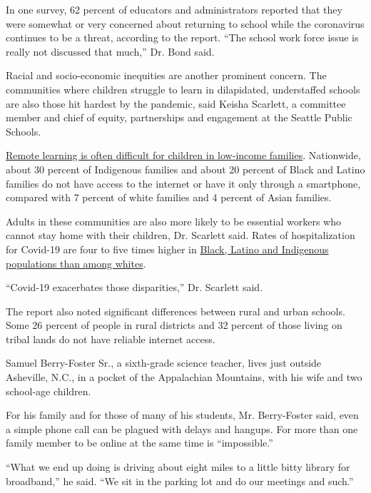 In one survey, 62 percent of educators and administrators reported that
they were somewhat or very concerned about returning to school while the
coronavirus continues to be a threat, according to the report. ``The
school work force issue is really not discussed that much,'' Dr. Bond
said.

Racial and socio-economic inequities are another prominent concern. The
communities where children struggle to learn in dilapidated,
understaffed schools are also those hit hardest by the pandemic, said
Keisha Scarlett, a committee member and chief of equity, partnerships
and engagement at the Seattle Public Schools.

\href{https://www.nytimes.com/2020/04/06/us/coronavirus-schools-attendance-absent.html}{Remote
learning is often difficult for children in low-income families}.
Nationwide, about 30 percent of Indigenous families and about 20 percent
of Black and Latino families do not have access to the internet or have
it only through a smartphone, compared with 7 percent of white families
and 4 percent of Asian families.

Adults in these communities are also more likely to be essential workers
who cannot stay home with their children, Dr. Scarlett said. Rates of
hospitalization for Covid-19 are four to five times higher in
\href{https://www.nytimes.com/interactive/2020/07/05/us/coronavirus-latinos-african-americans-cdc-data.html}{Black,
Latino and Indigenous populations than among whites}.

``Covid-19 exacerbates those disparities,'' Dr. Scarlett said.

The report also noted significant differences between rural and urban
schools. Some 26 percent of people in rural districts and 32 percent of
those living on tribal lands do not have reliable internet access.

Samuel Berry-Foster Sr., a sixth-grade science teacher, lives just
outside Asheville, N.C., in a pocket of the Appalachian Mountains, with
his wife and two school-age children.

For his family and for those of many of his students, Mr. Berry-Foster
said, even a simple phone call can be plagued with delays and hangups.
For more than one family member to be online at the same time is
``impossible.''

``What we end up doing is driving about eight miles to a little bitty
library for broadband,'' he said. ``We sit in the parking lot and do our
meetings and such.''

